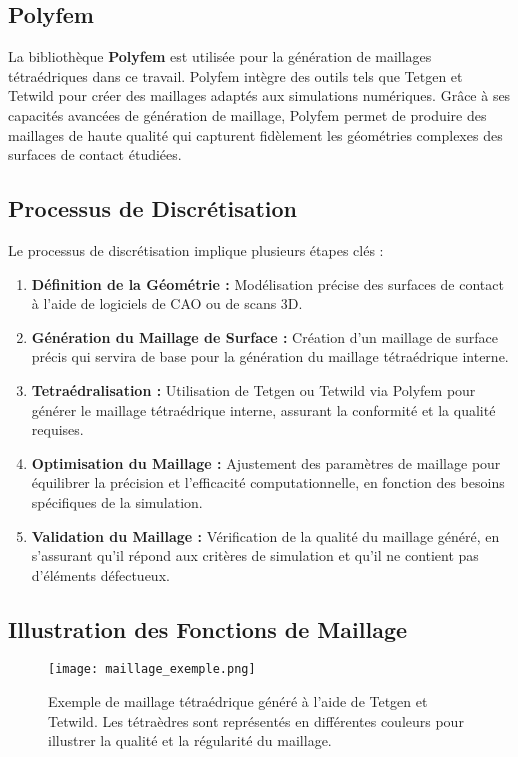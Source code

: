 \subsection{Polyfem}

La bibliothèque \textbf{Polyfem} est utilisée pour la génération de maillages tétraédriques dans ce travail. Polyfem intègre des outils tels que Tetgen et Tetwild pour créer des maillages adaptés aux simulations numériques. Grâce à ses capacités avancées de génération de maillage, Polyfem permet de produire des maillages de haute qualité qui capturent fidèlement les géométries complexes des surfaces de contact étudiées.

\subsection{Processus de Discrétisation}

Le processus de discrétisation implique plusieurs étapes clés :
\begin{enumerate}
    \item \textbf{Définition de la Géométrie :} Modélisation précise des surfaces de contact à l'aide de logiciels de CAO ou de scans 3D.
    \item \textbf{Génération du Maillage de Surface :} Création d'un maillage de surface précis qui servira de base pour la génération du maillage tétraédrique interne.
    \item \textbf{Tetraédralisation :} Utilisation de Tetgen ou Tetwild via Polyfem pour générer le maillage tétraédrique interne, assurant la conformité et la qualité requises.
    \item \textbf{Optimisation du Maillage :} Ajustement des paramètres de maillage pour équilibrer la précision et l'efficacité computationnelle, en fonction des besoins spécifiques de la simulation.
    \item \textbf{Validation du Maillage :} Vérification de la qualité du maillage généré, en s'assurant qu'il répond aux critères de simulation et qu'il ne contient pas d'éléments défectueux.
\end{enumerate}

\subsection{Illustration des Fonctions de Maillage}

\begin{figure}[h]
    \centering
    \texttt{[image: maillage\_exemple.png]}
    \caption{Exemple de maillage tétraédrique généré à l'aide de Tetgen et Tetwild. Les tétraèdres sont représentés en différentes couleurs pour illustrer la qualité et la régularité du maillage.}
    \label{fig:maillage_exemple}
\end{figure}

